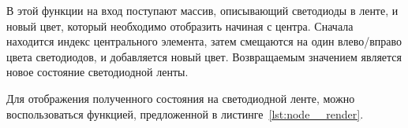 

В этой функции на вход поступают массив, описывающий светодиоды в ленте, и новый цвет, который необходимо отобразить начиная с центра. Сначала находится индекс центрального элемента, затем смещаются на один влево/вправо цвета светодиодов, и добавляется новый цвет. Возвращаемым значением является новое состояние светодиодной ленты.

Для отображения полученного состояния на светодиодной ленте, можно воспользоваться функцией, предложенной в листинге~\ref{lst:node__render}.


